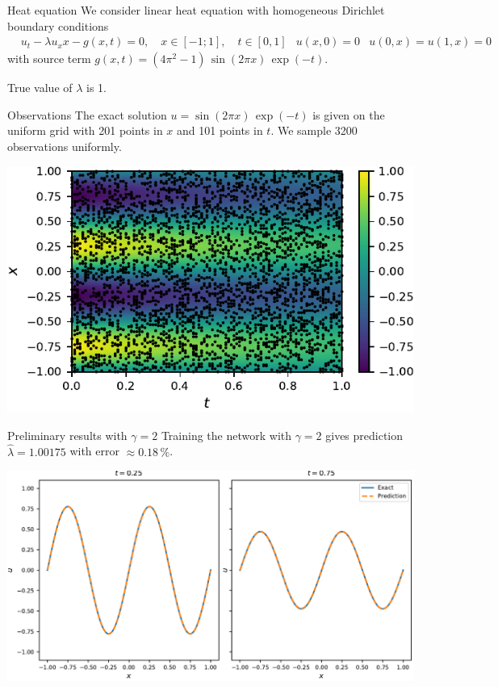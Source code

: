 \documentclass{beamer}
\def\\{}%
\begin{document}
\begin{frame}{Heat equation}
    We consider linear heat equation with homogeneous Dirichlet boundary
    conditions
\begin{align*}
    &u_t - \lambda u_xx - g(x, t) = 0, \quad x\in[-1; 1], \quad t\in[0, 1] \\
    &u(x, 0) = 0 \\
    &u(0, x) = u(1, x) = 0
\end{align*}
with source term $g(x, t) = (4\pi^2 -1) \, \sin(2\pi x) \, \exp(-t)$.

True value of $\lambda$ is 1.
\end{frame}

\begin{frame}{Observations}
The exact solution $u = \sin(2\pi x) \, \exp(-t)$ is given on the uniform grid
with 201 points in $x$ and 101 points in $t$. 
We sample 3200 observations uniformly.

\centering
\includegraphics{images/heateq-observations}
\end{frame}

\begin{frame}{Preliminary results with $\gamma=2$}
Training the network with $\gamma=2$ gives prediction $\widehat{\lambda} =
1.00175$ with error $\approx 0.18 \,\%$.

\vspace{0.5cm}
\centering
\includegraphics[scale=0.55]{images/heateq-predictions}

\end{frame}
\end{document}
